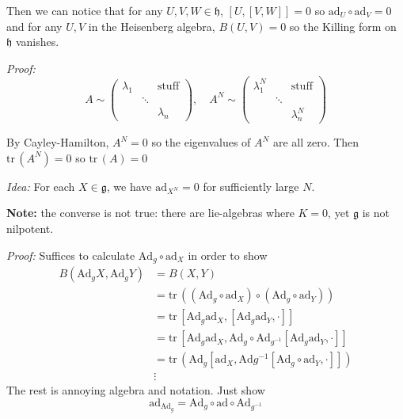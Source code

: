 \documentclass[12pt]{article}
\newcommand{\tr}{\text{tr}\,}
\newcommand{\g}{\mathfrak{g}}
\newcommand{\h}{\mathfrak{h}}
\newenvironment*{tbox}[2][gray]{
    \begin{tcolorbox}[
        parbox=false,
        colback=#1!5!white,
        colframe=#1!75!black,
        breakable,
        title={#2}
    ]}
    {\end{tcolorbox}}
\begin{document}
    Then we can notice that for any $U, V, W \in \h$, $[U, [V, W]] = 0$ so $\text{ad}_U \circ \text{ad}_V = 0$ and for any $U, V$ in the Heisenberg algebra, $B(U, V) = 0$ so the Killing form on $\h$ vanishes. 

    \begin{tbox}{\textbf{Lemma:} Let $A$ be a linear map on $V$ to $V$ finite dimensional so that $A$ is nilpotent. Then $\tr(A) = 0$}
        \emph{Proof:} 
        \[A \sim \begin{pmatrix}
            \lambda_1 & & \text{stuff} \\ 
            & \ddots & \\
            & & \lambda_n
        \end{pmatrix}, \quad A^N \sim \begin{pmatrix}
            \lambda_1^N & & \text{stuff} \\ 
            & \ddots & \\
            & & \lambda_n^N
        \end{pmatrix}\]

        By Cayley-Hamilton, $A^N = 0$ so the eigenvalues of $A^N$ are all zero. Then $\tr(A^N) = 0$ so $\tr(A) = 0$
    \end{tbox}

    \begin{tbox}{\textbf{Theorem:} Let $\g$ be a nilpotent lie-algebra. Then $K = 0$ on $\g$.}
        \emph{Idea:} For each $X \in \g$, we have $\text{ad}_{X^N} = 0$ for sufficiently large $N$. 
    \end{tbox}

    \textbf{Note:} the converse is not true: there are lie-algebras where $K = 0$, yet $\g$ is not nilpotent. 

    \begin{tbox}{\textbf{Theorem:} The Killing Form is Ad-invariant.}
        \emph{Proof:} Suffices to calculate $\text{Ad}_g \circ \text{ad}_X$ in order to show 
        \begin{align*}
            B(\text{Ad}_g X, \text{Ad}_g Y) &= B(X, Y)\\ 
                &= \tr((\text{Ad}_g \circ \text{ad}_X) \circ(\text{Ad}_g \circ \text{ad}_Y))\\ 
                &= \tr\left[\text{Ad}_g \text{ad}_X, [\text{Ad}_g \text{ad}_Y, \cdot]\right]\\ 
                &= \tr\left[\text{Ad}_g \text{ad}_X, \text{Ad}_g \circ \text{Ad}_{g^{-1}} [\text{Ad}_g \text{ad}_Y, \cdot]\right]\\ 
                &= \tr\left(\text{Ad}_g [\text{ad}_X, \text{Ad}{g^{-1}}[\text{Ad}_g \circ \text{ad}_Y, \cdot]]\right)\\ 
                &\vdots
        \end{align*}
        The rest is annoying algebra and notation. Just show 
        \[\text{ad}_{\text{Ad}_g} = \text{Ad}_g \circ \text{ad} \circ \text{Ad}_{g^{-1}}\]
    \end{tbox}
\end{document}
